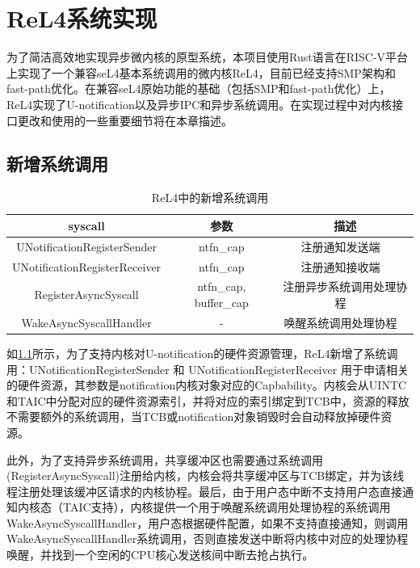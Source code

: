 \chapter{ReL4系统实现}
\label{chap:ReL4_impl}

为了简洁高效地实现异步微内核的原型系统，本项目使用Rust语言在RISC-V平台上实现了一个兼容seL4基本系统调用的微内核ReL4，目前已经支持SMP架构和fast-path优化。在兼容seL4原始功能的基础（包括SMP和fast-path优化）上， ReL4实现了U-notification以及异步IPC和异步系统调用。在实现过程中对内核接口更改和使用的一些重要细节将在本章描述。

\section{新增系统调用}

\begin{table}
    \centering
    \begin{tabular}{|c|c|c|}
        \hline 
        syscall & 参数 & 描述 \\
        \hline
        UNotificationRegisterSender & ntfn\_cap & 注册通知发送端 \ \\
        \hline
        UNotificationRegisterReceiver & ntfn\_cap & 注册通知接收端 \ \\
        \hline
        RegisterAsyncSyscall & ntfn\_cap, buffer\_cap & 注册异步系统调用处理协程 \ \\
        \hline
        WakeAsyncSyscallHandler & - & 唤醒系统调用处理协程 \ \\
        \hline
    \end{tabular}
    \caption{ReL4中的新增系统调用}
    \label{tab:new_syscall}
\end{table}

如\ref{tab:new_syscall}所示，为了支持内核对U-notification的硬件资源管理，ReL4新增了系统调用：UNotificationRegisterSender 和 UNotificationRegisterReceiver 用于申请相关的硬件资源，其参数是notification内核对象对应的Capbability。内核会从UINTC和TAIC中分配对应的硬件资源索引，并将对应的索引绑定到TCB中，资源的释放不需要额外的系统调用，当TCB或notification对象销毁时会自动释放掉硬件资源。

此外，为了支持异步系统调用，共享缓冲区也需要通过系统调用(RegisterAsyncSyscall)注册给内核，内核会将共享缓冲区与TCB绑定，并为该线程注册处理该缓冲区请求的内核协程。最后，由于用户态中断不支持用户态直接通知内核态（TAIC支持），内核提供一个用于唤醒系统调用处理协程的系统调用WakeAsyncSyscallHandler，用户态根据硬件配置，如果不支持直接通知，则调用WakeAsyncSyscallHandler系统调用，否则直接发送中断将内核中对应的处理协程唤醒，并找到一个空闲的CPU核心发送核间中断去抢占执行。

